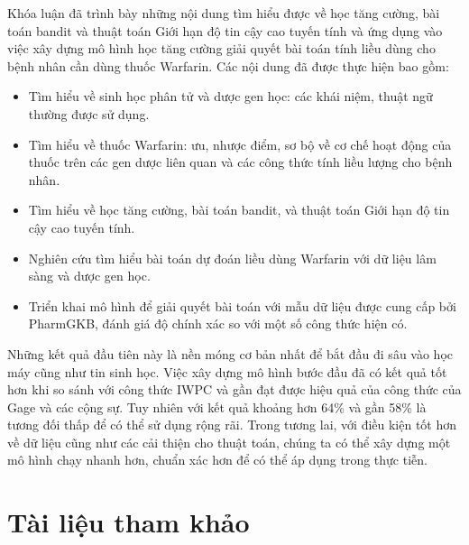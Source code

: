 \documentclass[14pt,oneside]{scrbook}
\providecommand{\tightlist}{\setlength{\itemsep}{\smallskipamount}\setlength{\parskip}{\smallskipamount}}
\begin{document}

Khóa luận đã trình bày những nội dung tìm hiểu được về học tăng cường,
bài toán bandit và thuật toán Giới hạn độ tin cậy cao tuyến tính và ứng
dụng vào việc xây dựng mô hình học tăng cường giải quyết bài toán tính
liều dùng cho bệnh nhân cần dùng thuốc Warfarin. Các nội dung đã được
thực hiện bao gồm:

\begin{itemize}
\tightlist
\item
  Tìm hiểu về sinh học phân tử và dược gen học: các khái niệm, thuật ngữ
  thường được sử dụng.
\item
  Tìm hiểu về thuốc Warfarin: ưu, nhược điểm, sơ bộ về cơ chế hoạt động
  của thuốc trên các gen dược liên quan và các công thức tính liều lượng
  cho bệnh nhân.
\item
  Tìm hiểu về học tăng cường, bài toán bandit, và thuật toán Giới hạn độ
  tin cậy cao tuyến tính.
\item
  Nghiên cứu tìm hiểu bài toán dự đoán liều dùng Warfarin với dữ liệu
  lâm sàng và dược gen học.
\item
  Triển khai mô hình để giải quyết bài toán với mẫu dữ liệu được cung
  cấp bởi PharmGKB, đánh giá độ chính xác so với một số công thức hiện
  có.
\end{itemize}

Những kết quả đầu tiên này là nền móng cơ bản nhất để bắt đầu đi sâu vào
học máy cũng như tin sinh học. Việc xây dựng mô hình bước đầu đã có kết
quả tốt hơn khi so sánh với công thức IWPC và gần đạt được hiệu quả của
công thức của Gage và các cộng sự. Tuy nhiên với kết quả khoảng hơn 64\%
và gần 58\% là tương đối thấp để có thể sử dụng rộng rãi. Trong tương
lai, với điều kiện tốt hơn về dữ liệu cũng như các cải thiện cho thuật
toán, chúng ta có thể xây dựng một mô hình chạy nhanh hơn, chuẩn xác hơn
để có thể áp dụng trong thực tiễn.

\chapter*{Tài liệu tham khảo}\label{tuxe0i-liux1ec7u-tham-khux1ea3o}

\end{document}
